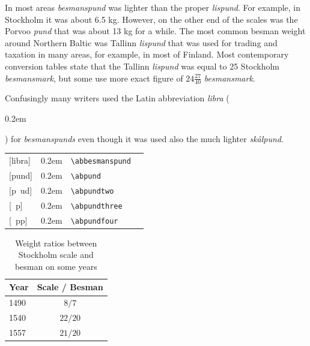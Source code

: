 \documentclass[a4paper]{article}
\newcommand{\samplefont}{\fontsize{16}{16}\abcursivefamily\spaceskip0.2em}
\newcommand{\sample}[1]{{\samplefont #1 \strut}}
\newcommand{\ltxncmd}[1]{\texttt{\textbackslash{}#1}}
\begin{document}
\begin{description}
In most areas \emph{besmanspund} was lighter than the proper
\emph{lispund}. For example, in Stockholm it was about 6.5 kg.
However, on the other end of the scales was the Porvoo \emph{pund}
that was about 13 kg for a while. The most common besman weight around
Northern Baltic was Tallinn \emph{lispund} that was used for trading
and taxation in many areas, for example, in most of Finland. Most
contemporary conversion tables state that the Tallinn \emph{lispund}
was equal to 25 Stockholm \emph{besmansmark}, but some use more exact
figure of $24\frac{27}{40}$ \emph{besmansmark}.

Confusingly many writers used the Latin abbreviation \emph{libra}
(\sample{\abbesmanspund}) for \emph{besmanspunds} even though it was
used also the much lighter \emph{skålpund}.

\begin{center}
  \begin{tabular}{llll}
    {}[libra]  & \sample{\abbesmanspund} & \ltxncmd{abbesmanspund} \\
    {}[pund]  & \sample{\abpund} & \ltxncmd{abpund} \\
    {}[p~ud]  & \sample{\abpundtwo} & \ltxncmd{abpundtwo} \\
    {}[~p]  & \sample{\abpundthree} & \ltxncmd{abpundthree} \\
    {}[~pp]  & \sample{\abpundfour} & \ltxncmd{abpundfour} \\
  \end{tabular}
\end{center}


\begin{table}
  \centering
  \begin{tabular}{lc}
    Year & Scale / Besman \\
    \hline 
    1490 &  $8/7$ \\
    1540 &  $22/20$ \\
    1557 &  $21/20$ \\
  \end{tabular}
  \caption{Weight ratios between Stockholm scale and besman on some years}
  \label{tab:stockholm_weight_ratio}
\end{table}



\end{description}
\end{document}
